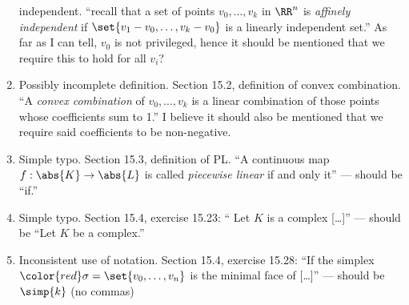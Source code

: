 \documentclass{fkletter}
\begin{document}
\begin{enumerate}
    independent. ``recall that a set of points $v_0, \ldots, v_k$ in $\RR^n$ is
    \emph{affinely independent} if $\set{v_1 - v_0, \ldots, v_k - v_0}$ is a
    linearly independent set.'' {\color{red} As far as I can tell, $v_0$ is not
      privileged, hence it should be mentioned that we require this to hold for
      all $v_i$?}
  \item Possibly incomplete definition. Section 15.2, definition of convex
    combination. ``A \emph{convex combination} of $v_0, \ldots, v_k$ is a linear
    combination of those points whose coefficients sum to 1.'' {\color{red} I
      believe it should also be mentioned that we require said coefficients to
      be non-negative.}
  \item Simple typo. Section 15.3, definition of PL. ``A continuous map $f :
    \abs{K} \to \abs{L}$ is called \emph{piecewise linear} if and only
    {\color{red} it}'' --- should be ``if.''
  \item Simple typo. Section 15.4, exercise 15.23: ``{\color{red} Let $K$ is a
      complex} [\ldots]'' --- should be ``Let $K$ be a complex.''
  \item Inconsistent use of notation. Section 15.4, exercise 15.28: ``If the
    simplex $\color{red} \sigma= \set{v_0,\ldots,v_n}$ is the minimal face of
    [\ldots]'' --- should be $\simp{k}$ (no commas)
\end{enumerate}
\end{document}
